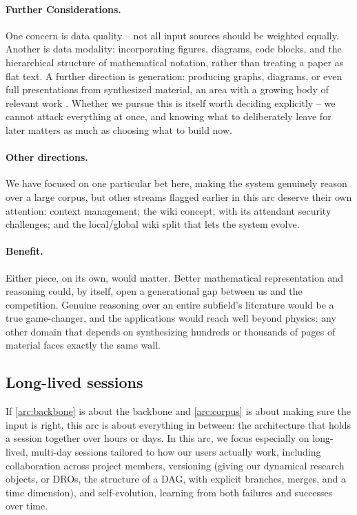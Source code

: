 \paragraph{Further Considerations.}
One concern is data quality -- not all input sources should be weighted equally. Another is data modality: incorporating figures, diagrams, code blocks, and the hierarchical structure of mathematical notation, rather than treating a paper as flat text.
A further direction is generation: producing graphs, diagrams, or even full presentations from synthesized material, an area with a growing body of relevant work \cite{2601.23265, 2603.03072, 2605.30611}. Whether we pursue this is itself worth deciding explicitly -- we cannot attack everything at once, and knowing what to deliberately leave for later matters as much as choosing what to build now.

\paragraph{Other directions.}
We have focused on one particular bet here, making the system genuinely reason over a large corpus, but other streams flagged earlier in this arc deserve their own attention: context management; the wiki concept, with its attendant security challenges; and the local/global wiki split that lets the system evolve.

\paragraph{Benefit.}
Either piece, on its own, would matter. Better mathematical representation and reasoning could, by itself, open a generational gap between us and the competition. Genuine reasoning over an entire subfield's literature would be a true game-changer, and the applications would reach well beyond physics: any other domain that depends on synthesizing hundreds or thousands of pages of material faces exactly the same wall.


\subsection{Long-lived sessions}
\label{arc:architecture}
\label{arc:sessions}  %

\begin{summarybox}
    If \ref{arc:backbone} is about the backbone and \ref{arc:corpus} is about making sure the input is right, this arc is about everything in between: the architecture that holds a session together over hours or days. In this arc, we focus especially on long-lived, multi-day sessions tailored to how our users actually work, including collaboration across project members, versioning (giving our dynamical research objects, or DROs, the structure of a DAG, with explicit branches, merges, and a time dimension), and self-evolution, learning from both failures and successes over time.
\end{summarybox}

